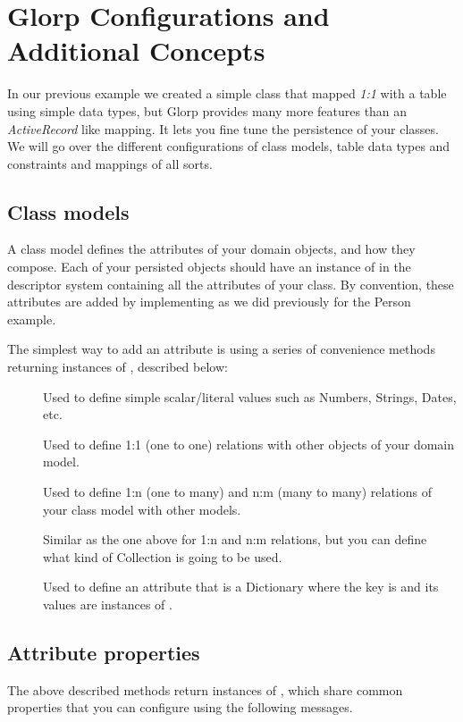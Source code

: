\documentclass[10pt,twoside,english]{_support/latex/sbabook/sbabook}
\begin{document}
\chapter{Glorp Configurations and Additional Concepts}
In our previous example we created a simple class that mapped \textit{1:1} with a
table using simple data types, but Glorp provides many more features than
an \textit{ActiveRecord} like mapping. It lets you fine tune the persistence of
your classes. We will go over the different configurations of class models,
table data types and constraints and mappings of all sorts.
\section{Class models}
A class model defines the attributes of your domain objects, and how they
compose. Each of your persisted objects should have an instance of
 in the descriptor system containing all the
attributes of your class. By convention, these attributes are added by
implementing  as we did previously for the Person example.

The simplest way to add an attribute is using a series of convenience methods returning instances of ,
 described below:

\begin{description}
\item[] Used to define simple scalar/literal values such as Numbers, Strings, Dates, etc.
\item[] Used to define 1:1 (one to one) relations with other objects of your domain model.
\item[] Used to define 1:n (one to many) and n:m (many to many) relations of your class model with other models.
\item[] Similar as the one above for 1:n and n:m relations, but you can define what kind of Collection is going to be used.
\item[] Used to define an attribute that is a Dictionary where the key is  and its values are instances of .
\end{description}
\section{Attribute properties}
The above described methods return instances of , which
share common properties that you can configure using the following messages.
\end{document}
